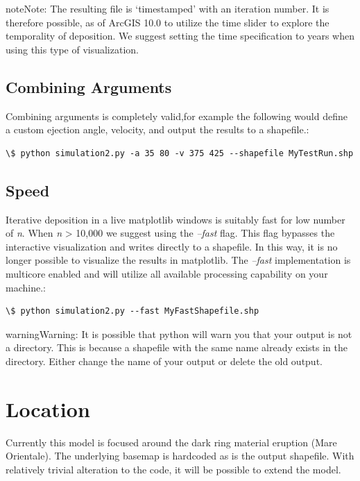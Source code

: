 \documentclass[letterpaper,10pt,english]{sphinxmanual}
\begin{document}
\begin{notice}{note}{Note:}
The resulting file is `timestamped' with an iteration number.  It is therefore possible, as of ArcGIS 10.0 to utilize the time slider to explore the temporality of deposition.  We suggest setting the time specification to years when using this type of visualization.
\end{notice}


\subsection{Combining Arguments}
\label{Using:combining-arguments}
Combining arguments is completely valid,for example the following would define a custom ejection angle, velocity, and output the results to a shapefile.:

\begin{Verbatim}[commandchars=\\\{\}]
\$ python simulation2.py -a 35 80 -v 375 425 --shapefile MyTestRun.shp
\end{Verbatim}


\subsection{Speed}
\label{Using:speed}
Iterative deposition in a live matplotlib windows is suitably fast for low number of \emph{n}.  When \emph{n} \textgreater{} 10,000 we suggest using the \emph{--fast} flag.  This flag bypasses the interactive visualization and writes directly to a shapefile.  In this way, it is no longer possible to visualize the results in matplotlib.  The \emph{--fast} implementation is multicore enabled and will utilize all available processing capability on your machine.:

\begin{Verbatim}[commandchars=\\\{\}]
\$ python simulation2.py --fast MyFastShapefile.shp
\end{Verbatim}

\begin{notice}{warning}{Warning:}
It is possible that python will warn you that your output is not a directory.  This is because a shapefile with the same name already exists in the directory.  Either change the name of your output or delete the old output.
\end{notice}


\section{Location}
\label{Using:location}
Currently this model is focused around the dark ring material eruption (Mare Orientale).  The underlying basemap is hardcoded as is the output shapefile.  With relatively trivial alteration to the code, it will be possible to extend the model.
\end{document}

